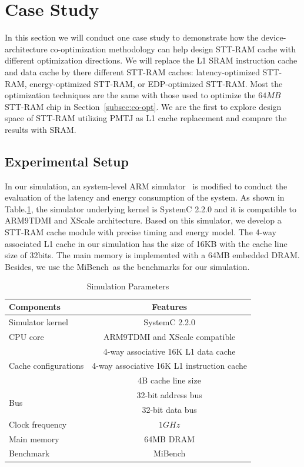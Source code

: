 \section{Case Study} \label{sec:case}
In this section we will conduct one case study to demonstrate how the device-architecture co-optimization methodology can help design STT-RAM cache with different optimization directions. We will replace the L1 SRAM instruction cache and data cache by there different STT-RAM caches: latency-optimized STT-RAM, energy-optimized STT-RAM, or EDP-optimized STT-RAM. Most the optimization techniques are the same with those used to optimize the $64MB$ STT-RAM chip in Section~\ref{subsec:co-opt}. We are the first to explore design space of STT-RAM utilizing PMTJ as L1 cache replacement and compare the results with SRAM.

\subsection{Experimental Setup}
In our simulation, an system-level ARM simulator~\cite{FaCSim} is modified to conduct the evaluation of the latency and energy consumption of the system. As shown in Table.\ref{tb:parameters}, the simulator underlying kernel is SystemC 2.2.0 and it is compatible to ARM9TDMI and XScale architecture. Based on this simulator, we develop a STT-RAM cache module with precise timing and energy model. The 4-way associated  L1 cache in our simulation has the size of 16KB with the cache line size of 32bits. The main memory is implemented with a 64MB embedded DRAM. Besides, we use the MiBench~\cite{MiBench}as the benchmarks for our simulation.

\begin{table}[t]
\centering
\caption{Simulation Parameters}
\label{tb:parameters}
\vspace{-5pt}
\begin{tabular}{ l | c }
\hline \hline
Components & Features\\
\hline
Simulator kernel & SystemC 2.2.0\\
\hline
CPU core & ARM9TDMI and XScale compatible \\
\hline
\multirow{3}{*}{Cache configurations} & 4-way associative 16K L1 data cache \\
& 4-way associative 16K L1 instruction cache \\
& 4B cache line size \\
\hline
\multirow{2}{*}{Bus} & 32-bit address bus  \\
& 32-bit data bus \\
\hline
Clock frequency & $1GHz$ \\
\hline
Main memory & 64MB DRAM \\
\hline
Benchmark & MiBench \\
\hline\hline
\end{tabular}
\vspace{-10pt}
\end{table}

